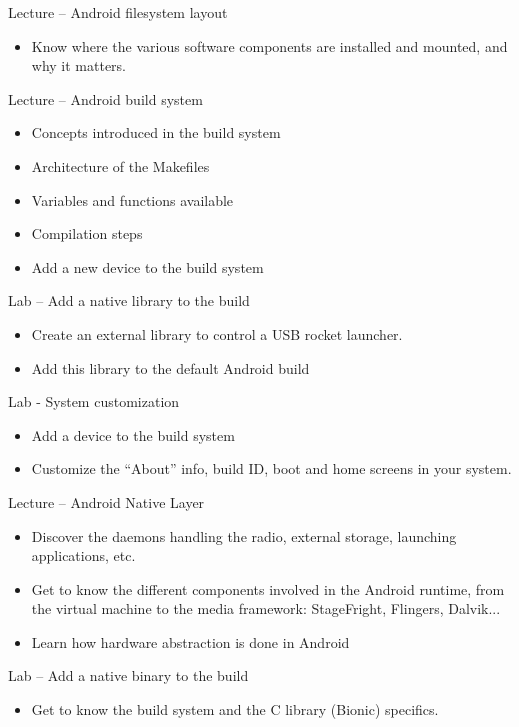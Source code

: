 \documentclass[a4paper,12pt,obeyspaces,spaces,hyphens]{article}
\begin{document}
\feagendaonecolumn
{Lecture – Android filesystem layout}
{
  \begin{itemize}
  \item Know where the various software components are installed and
    mounted, and why it matters.
  \end{itemize}
}

\feagendatwocolumn
{Lecture – Android build system}
{
  \begin{itemize}
  \item Concepts introduced in the build system
  \item Architecture of the Makefiles
  \item Variables and functions available
  \item Compilation steps
  \item Add a new device to the build system
  \end{itemize}
}
{Lab – Add a native library to the build}
{
  \begin{itemize}
  \item Create an external library to control a USB rocket launcher.
  \item Add this library to the default Android build
  \end{itemize}
}

\feagendaonecolumn
{Lab - System customization}
{
  \begin{itemize}
  \item Add a device to the build system
  \item Customize the “About” info, build ID, boot and home screens in
    your system.
  \end{itemize}
}

\feagendatwocolumn
{Lecture – Android Native Layer}
{
  \begin{itemize}
  \item Discover the daemons handling the radio, external storage,
    launching applications, etc.
  \item Get to know the different components involved in the Android
    runtime, from the virtual machine to the media framework:
    StageFright, Flingers, Dalvik...
  \item Learn how hardware abstraction is done in Android
  \end{itemize}
}
{Lab – Add a native binary to the build}
{
  \begin{itemize}
  \item Get to know the build system and the C library (Bionic)
    specifics.
  \end{itemize}
}
\end{document}
